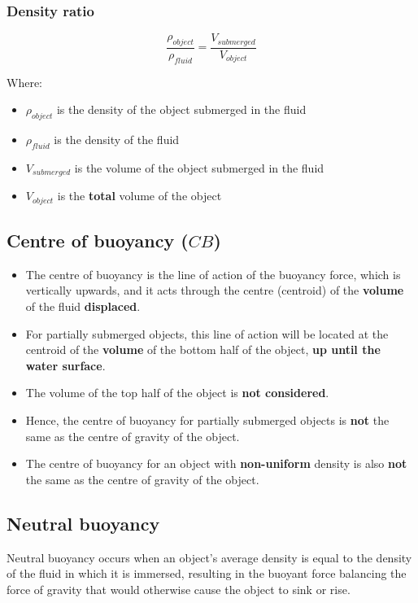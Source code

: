 \documentclass[11pt]{article}
\begin{document}
\subsubsection{Density ratio}
\label{sec:org92594dc}
\[\frac{\rho_{object}}{\rho_{fluid}} = \frac{V_{submerged}}{V_{object}}\]

Where:
\begin{itemize}
\item \(\rho_{object}\) is the density of the object submerged in the fluid
\item \(\rho_{fluid}\) is the density of the fluid
\item \(V_{submerged}\) is the volume of the object submerged in the fluid
\item \(V_{object}\) is the \textbf{total} volume of the object
\end{itemize}

\newpage

\subsection{Centre of buoyancy (\(CB\))}
\label{sec:org8754647}
\begin{itemize}
\item The centre of buoyancy is the line of action of the buoyancy force, which is vertically upwards, and it acts through the centre (centroid) of the \textbf{volume} of the fluid \textbf{displaced}.
\item For partially submerged objects, this line of action will be located at the centroid of the \textbf{volume} of the bottom half of the object, \textbf{up until the water surface}.
\item The volume of the top half of the object is \textbf{not considered}.
\item Hence, the centre of buoyancy for partially submerged objects is \textbf{not} the same as the centre of gravity of the object.
\item The centre of buoyancy for an object with \textbf{non-uniform} density is also \textbf{not} the same as the centre of gravity of the object.
\end{itemize}

\subsection{Neutral buoyancy}
\label{sec:org61b4d81}
Neutral buoyancy occurs when an object's average density is equal to the density of the fluid in which it is immersed, resulting in the buoyant force balancing the force of gravity that would otherwise cause the object to sink or rise.
\end{document}
